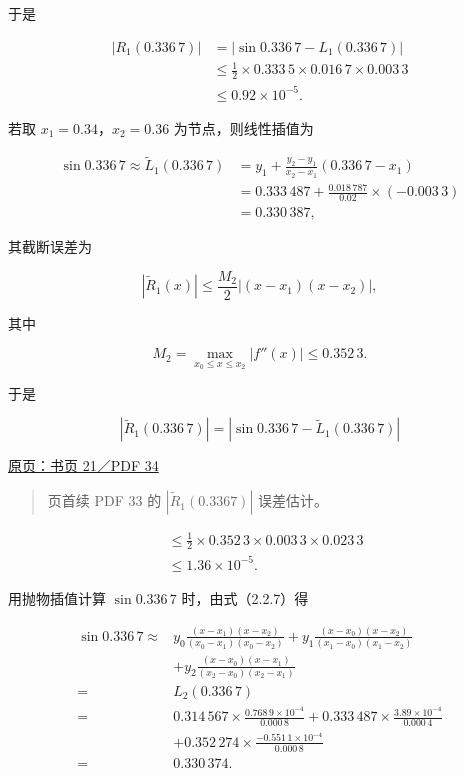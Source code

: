 \documentclass[
  10pt,
  fontset=fandol]{ctexart}
\begin{document}
于是

\[
\begin{aligned}
|R_1(0.336\,7)|
&=|\sin0.336\,7-L_1(0.336\,7)|\\
&\le\frac12\times0.333\,5\times0.016\,7\times0.003\,3\\
&\le0.92\times10^{-5}.
\end{aligned}
\]

若取 \(x_1=0.34\)，\(x_2=0.36\) 为节点，则线性插值为

\[
\begin{aligned}
\sin0.336\,7\approx\widetilde L_1(0.336\,7)
&=y_1+\frac{y_2-y_1}{x_2-x_1}(0.336\,7-x_1)\\
&=0.333\,487+\frac{0.018\,787}{0.02}\times(-0.003\,3)\\
&=0.330\,387,
\end{aligned}
\]

其截断误差为

\[
|\widetilde R_1(x)|\le\frac{M_2}{2}|(x-x_1)(x-x_2)|,
\]

其中

\[
M_2=\max_{x_0\le x\le x_2}|f''(x)|\le0.352\,3.
\]

于是

\[
|\widetilde R_1(0.336\,7)|=|\sin0.336\,7-\widetilde L_1(0.336\,7)|
\]

\href{../../source-images/pdf-034.jpeg}{原页：书页 21／PDF 34}

\begin{quote}
页首续 PDF 33 的 \(|\widetilde R_1(0.3367)|\) 误差估计。
\end{quote}

\[
\begin{aligned}
&\le\frac12\times0.352\,3\times0.003\,3\times0.023\,3\\
&\le1.36\times10^{-5}.
\end{aligned}
\]

用抛物插值计算 \(\sin0.336\,7\) 时，由式（2.2.7）得

\[
\begin{aligned}
\sin0.336\,7\approx{}&
y_0\frac{(x-x_1)(x-x_2)}{(x_0-x_1)(x_0-x_2)}
+y_1\frac{(x-x_0)(x-x_2)}{(x_1-x_0)(x_1-x_2)}\\
&+y_2\frac{(x-x_0)(x-x_1)}{(x_2-x_0)(x_2-x_1)}\\
={}&L_2(0.336\,7)\\
={}&0.314\,567\times\frac{0.768\,9\times10^{-4}}{0.000\,8}
+0.333\,487\times\frac{3.89\times10^{-4}}{0.000\,4}\\
&+0.352\,274\times\frac{-0.551\,1\times10^{-4}}{0.000\,8}\\
={}&0.330\,374.
\end{aligned}
\]
\end{document}
